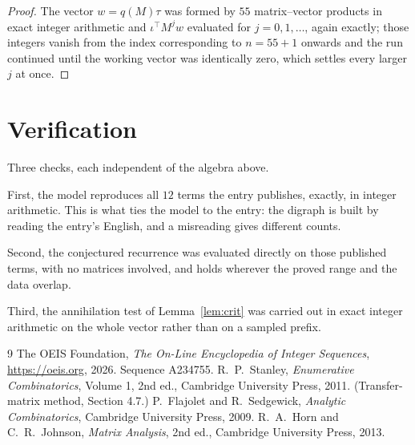 \documentclass[11pt,a4paper]{article}
\theoremstyle{plain}
\theoremstyle{definition}
\begin{document}
\begin{proof}
The vector $w=q(M)\tau$ was formed by $55$ matrix--vector products in exact integer
arithmetic and $\iota^{\!\top}M^{j}w$ evaluated for $j=0,1,\dots$, again exactly; those
integers vanish from the index corresponding to $n=55+1$ onwards and the run continued
until the working vector was identically zero, which settles every larger $j$ at once.
\end{proof}

\section{Verification}

Three checks, each independent of the algebra above.

First, the model reproduces all $12$ terms the entry publishes, exactly, in integer
arithmetic. This is what ties the model to the entry: the digraph is built by reading the
entry's English, and a misreading gives different counts.

Second, the conjectured recurrence was evaluated directly on those published terms, with no
matrices involved, and holds wherever the proved range and the data overlap.

Third, the annihilation test of Lemma~\ref{lem:crit} was carried out in exact integer
arithmetic on the whole vector rather than on a sampled prefix.

\begin{thebibliography}{9}
 The OEIS Foundation, \emph{The On-Line Encyclopedia of Integer
Sequences}, \url{https://oeis.org}, 2026. Sequence A234755.
 R.~P.~Stanley, \emph{Enumerative Combinatorics}, Volume 1, 2nd ed.,
Cambridge University Press, 2011. (Transfer-matrix method, Section 4.7.)
 P.~Flajolet and R.~Sedgewick, \emph{Analytic Combinatorics}, Cambridge
University Press, 2009.
 R.~A.~Horn and C.~R.~Johnson, \emph{Matrix Analysis}, 2nd ed., Cambridge
University Press, 2013.
\end{thebibliography}
\end{document}
